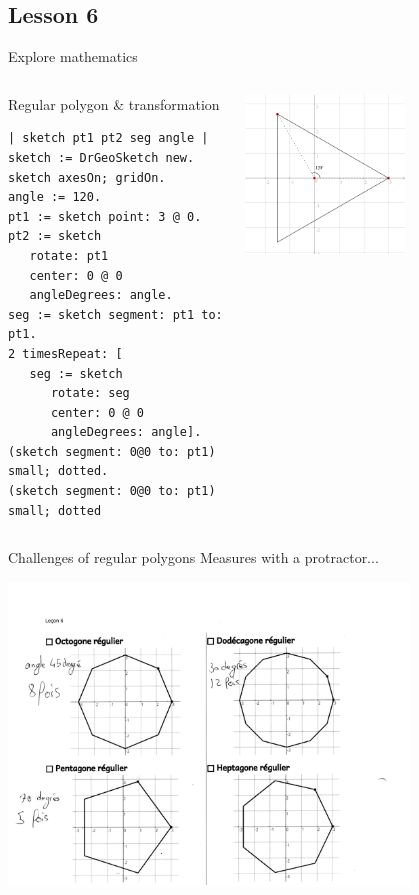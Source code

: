 \documentclass{beamer}
\begin{document}
\subsection{Lesson 6}
\begin{frame}[fragile]{Explore mathematics}
  \begin{columns}[c]
    \begin{column}{0.5\textwidth}
      Regular polygon \& transformation
      \vspace*{10pt}
      \fontsize{9pt}{0pt}\selectfont
      \begin{lstlisting}[language=Smalltalk]
| sketch pt1 pt2 seg angle |
sketch := DrGeoSketch new.
sketch axesOn; gridOn.
angle := 120.
pt1 := sketch point: 3 @ 0.
pt2 := sketch
   rotate: pt1
   center: 0 @ 0
   angleDegrees: angle.
seg := sketch segment: pt1 to: pt1.
2 timesRepeat: [
   seg := sketch
      rotate: seg
      center: 0 @ 0
      angleDegrees: angle].
(sketch segment: 0@0 to: pt1) small; dotted.
(sketch segment: 0@0 to: pt1) small; dotted        
      \end{lstlisting}
    \end{column}
    \begin{column}{0.5\textwidth}
      \includegraphics[width=0.6\textwidth]{lesson6.png}
    \end{column}
  \end{columns} 
\end{frame}
%
\begin{frame}{Challenges of regular polygons}
  Measures with a protractor...
  \begin{center}
      \includegraphics[width=0.8\textwidth]{lesson6-2.png}
  \end{center}
\end{frame}
\end{document}
